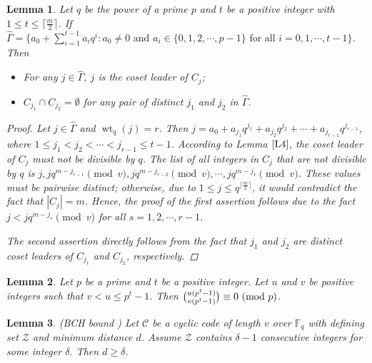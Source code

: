 \documentclass[pdflatex,sn-mathphys-num]{sn-jnl}%
\newtheorem{lemma}{Lemma}
\theoremstyle{thmstyleone}%
\theoremstyle{thmstyletwo}%
\theoremstyle{thmstylethree}%
\begin{document}
\begin{lemma}\label{L7}
    Let $q$ be the power of a prime $p$ and $t$ be a positive integer with $1\leq t\leq\lceil\frac{m}{2}\rceil$. If $\widehat{\Gamma}=\{a_{0}+\sum_{i=1}^{t-1}a_{i}q^{i}:a_{0}\neq 0\text{ and }a_{i}\in\{0,1,2,\cdots,p-1\}\text{ for all }i=0,1,\cdots,t-1\}$. Then 
     \begin{itemize}
        \item For any $j\in\widehat{\Gamma}$, $j$ is the coset leader of $C_{j}$;
        \item $C_{j_{1}}\cap C_{j_{2}}=\emptyset$ for any pair of distinct $j_{1}$ and $j_{2}$ in $\widehat{\Gamma}$.
    \end{itemize}
    \begin{proof}
        Let $j\in\widehat{\Gamma}$ and $\operatorname{wt}_{q}(j)=r$. Then $j=a_{0}+a_{j_{1}}q^{j_{1}}+a_{j_{2}}q^{j_{2}}+\cdots+a_{j_{r-1}}q^{j_{r-1}}$, where $1\leq j_{1}<j_{2}<\cdots<j_{r-1}\leq t-1$. According to Lemma $\ref{L4}$, the coset leader of $C_{j}$ must not be divisible by $q$. The list of all integers in $C_{j}$ that are not divisible by $q$ is $j, jq^{m-j_{r-1}}\pmod{v},jq^{m-j_{r-2}}\pmod{v},\cdots,jq^{m-j_{1}}\pmod{v}$. These values must be pairwise distinct; otherwise, due to $1\leq j\leq q^{\lceil\frac{m}{2}\rceil}$, it would contradict the fact that $|C_{j}|=m$. Hence, the proof of the first assertion follows due to the fact $j<jq^{m-j_{s}}\pmod{v}$ for all $s=1,2,\cdots,r-1$.
      \par The second assertion directly follows from the fact that $j_{1}$ and $j_{2}$ are distinct coset leaders of $C_{j_{1}}$ and $C_{j_{2}}$, respectively.
    \end{proof}
\end{lemma}
\vspace{0.5em}
\begin{lemma}\textnormal{\cite[Lemma $15$]{Kewat1}}\label{L21}
    Let $p$ be a prime and $t$ be a positive integer. Let $u$ and $v$ be positive integers such that $v<u\leq p^t-1$. Then $\binom{u(p^t-1)}{v(p^t-1)}\equiv 0\textnormal{ (mod $p$)}$.
\end{lemma}
\vspace{0.5em}
\begin{lemma}\textnormal{(BCH bound \cite{P0})}
    Let $\mathcal{C}$ be a cyclic code of length $v$ over $\mathbb{F}_{q}$ with defining set $\mathcal{Z}$ and minimum distance $d$. Assume $\mathcal{Z}$ contains $\delta-1$ consecutive integers for some integer $\delta$. Then $d\geq\delta$.
\end{lemma}
\end{document}
